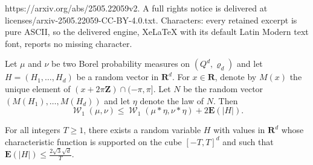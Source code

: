 \documentclass[10pt,a4paper]{amsart}
\newcommand{\Rr}{\mathbf{R}}
\newcommand{\Zz}{\mathbf{Z}}
\newcommand{\expect}{\mathbf{E}}
\renewcommand{\rho}{\varrho}
\DeclareMathOperator{\wass}{\mathcal{W}}
\begin{document}
https://arxiv.org/abs/2505.22059v2. A full rights notice is delivered at licenses/arxiv-2505.22059-CC-BY-4.0.txt. Characters: every retained excerpt is pure ASCII, so the delivered engine, XeLaTeX with its default Latin Modern text font, reports no missing character.
\begin{lemma}\label{lem: regularization cost}
  Let $\mu$ and $\nu$ be two Borel probability measures on
  $(Q^d, \rho_d)$ and let $H = (H_1, \dots, H_d)$ be a random vector
  in $\Rr^d$. For $x \in \Rr$, denote by $M(x)$ the unique element of
  $(x + 2 \pi \Zz)\cap(-\pi, \pi]$. Let $N$ be the random vector
  $(M(H_1), \dots, M(H_d))$ and let $\eta$ denote the law of $N$. Then
  $$
  \wass_1(\mu, \nu) \leqslant 	\wass_1(\mu* \eta, \nu * \eta) + 2 \expect(|H|).
  $$
\end{lemma}

\begin{lemma}\label{lem: choice of H}
  For all integers $T \geqslant 1$, there exists a random variable $H$
  with values in $\Rr^d$ whose characteristic function is supported on
  the cube $[-T,T]^d$ and such that
  $\expect(|H|) \leqslant \frac{2 \sqrt{3}\sqrt{d}}{T}$.
\end{lemma}
\end{document}
